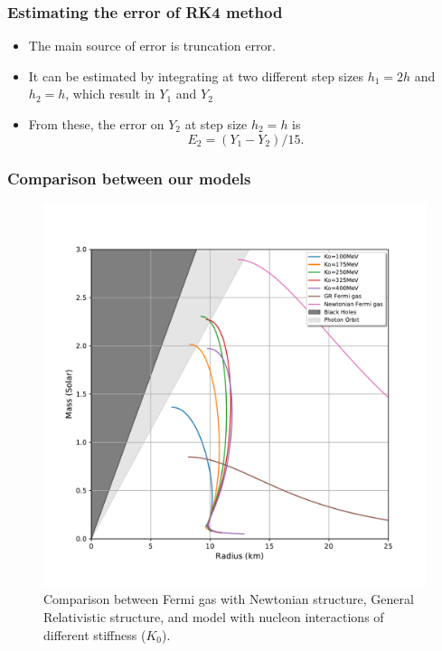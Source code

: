 \documentclass[hperref={pdfpagelabels=false}]{beamer}
\begin{document}
\begin{frame}
    \frametitle{Estimating the error of RK4 method}
    \begin{itemize}
     \item The main source of error is truncation error.
    \end{itemize}
    \begin{itemize}
     \item It can be estimated by integrating at two different step sizes $h_{1}=2h$ and $h_{2}=h$, which result in $Y_{1}$ and $Y_{2}$
    \end{itemize}
    \begin{itemize}
     \item From these, the error on $Y_{2}$ at step size $h_{2}=h$ is \[E_{2}=(Y_{1}-Y_{2})/15.\]
    \end{itemize}
\end{frame}

\begin{frame}
 \frametitle{Comparison between our models}
 \begin{figure}
    \includegraphics[scale=0.3]{eos_compare_our_model.pdf}
    \caption{Comparison between Fermi gas with Newtonian structure, General Relativistic structure, and model with nucleon interactions of different stiffness ($K_{0}$).}\label{fig/ourmodel}
  \end{figure}
\end{frame}
\end{document}
